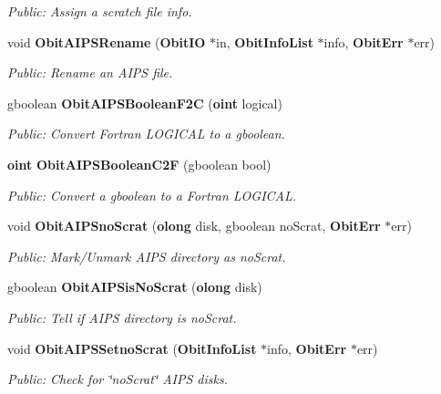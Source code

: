 \begin{CompactItemize}
\begin{CompactList}\small\item\em Public: Assign a scratch file info. \item\end{CompactList}\item 
void {\bf Obit\-AIPSRename} ({\bf Obit\-IO} $\ast$in, {\bf Obit\-Info\-List} $\ast$info, {\bf Obit\-Err} $\ast$err)
\begin{CompactList}\small\item\em Public: Rename an AIPS file. \item\end{CompactList}\item 
gboolean {\bf Obit\-AIPSBoolean\-F2C} ({\bf oint} logical)
\begin{CompactList}\small\item\em Public: Convert Fortran LOGICAL to a gboolean. \item\end{CompactList}\item 
{\bf oint} {\bf Obit\-AIPSBoolean\-C2F} (gboolean bool)
\begin{CompactList}\small\item\em Public: Convert a gboolean to a Fortran LOGICAL. \item\end{CompactList}\item 
void {\bf Obit\-AIPSno\-Scrat} ({\bf olong} disk, gboolean no\-Scrat, {\bf Obit\-Err} $\ast$err)
\begin{CompactList}\small\item\em Public: Mark/Unmark AIPS directory as no\-Scrat. \item\end{CompactList}\item 
gboolean {\bf Obit\-AIPSis\-No\-Scrat} ({\bf olong} disk)
\begin{CompactList}\small\item\em Public: Tell if AIPS directory is no\-Scrat. \item\end{CompactList}\item 
void {\bf Obit\-AIPSSetno\-Scrat} ({\bf Obit\-Info\-List} $\ast$info, {\bf Obit\-Err} $\ast$err)
\begin{CompactList}\small\item\em Public: Check for \char`\"{}no\-Scrat\char`\"{} AIPS disks. \item\end{CompactList}\end{CompactItemize}


